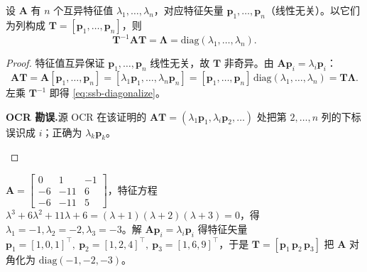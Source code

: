 \begin{theorem}[特征值互异时可对角化]\label{thm:ssb-diag}
设 $\mathbf{A}$ 有 $n$ 个互异特征值 $\lambda_1,\dots,\lambda_n$，对应特征矢量 $\mathbf{p}_1,\dots,\mathbf{p}_n$（线性无关）。以它们为列构成 $\mathbf{T}=[\mathbf{p}_1,\dots,\mathbf{p}_n]$，则
\begin{equation}
  \mathbf{T}^{-1}\mathbf{A}\mathbf{T}=\boldsymbol{\Lambda}=\mathrm{diag}(\lambda_1,\dots,\lambda_n).
  \label{eq:ssb-diagonalize}
\end{equation}
\end{theorem}
\begin{proof}
特征值互异保证 $\mathbf{p}_1,\dots,\mathbf{p}_n$ 线性无关，故 $\mathbf{T}$ 非奇异。由 $\mathbf{A}\mathbf{p}_i=\lambda_i\mathbf{p}_i$：
\[
  \mathbf{A}\mathbf{T}=\mathbf{A}[\mathbf{p}_1,\dots,\mathbf{p}_n]=[\lambda_1\mathbf{p}_1,\dots,\lambda_n\mathbf{p}_n]=[\mathbf{p}_1,\dots,\mathbf{p}_n]\,\mathrm{diag}(\lambda_1,\dots,\lambda_n)=\mathbf{T}\boldsymbol{\Lambda}.
\]
左乘 $\mathbf{T}^{-1}$ 即得 \cref{eq:ssb-diagonalize}。
\begin{note}\textbf{OCR 勘误.}\;源 OCR 在该证明的 $\mathbf{A}\mathbf{T}=(\lambda_1\mathbf{p}_1,\lambda_i\mathbf{p}_2,\dots)$ 处把第 $2,\dots,n$ 列的下标误识成 $i$；正确为 $\lambda_k\mathbf{p}_k$\cite{liubao2006modern}。\end{note}
\end{proof}

\begin{example}[对角化]\label{ex:ssb-diag}
$\mathbf{A}=\begin{bmatrix}0&1&-1\\-6&-11&6\\-6&-11&5\end{bmatrix}$，特征方程 $\lambda^3+6\lambda^2+11\lambda+6=(\lambda+1)(\lambda+2)(\lambda+3)=0$，得 $\lambda_1=-1,\lambda_2=-2,\lambda_3=-3$。解 $\mathbf{A}\mathbf{p}_i=\lambda_i\mathbf{p}_i$ 得特征矢量
$\mathbf{p}_1=[1,0,1]^\top,\ \mathbf{p}_2=[1,2,4]^\top,\ \mathbf{p}_3=[1,6,9]^\top$，于是 $\mathbf{T}=[\mathbf{p}_1\,\mathbf{p}_2\,\mathbf{p}_3]$ 把 $\mathbf{A}$ 对角化为 $\mathrm{diag}(-1,-2,-3)$。
\end{example}

